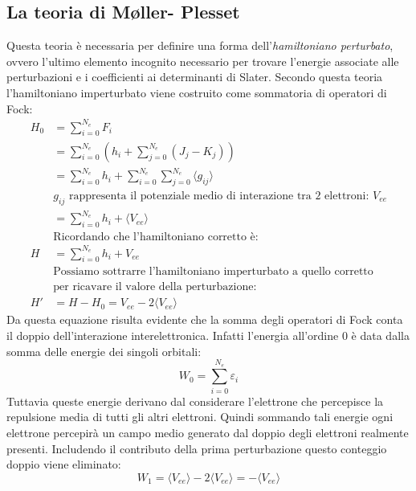 \documentclass[oneside]{amsbook}
\numberwithin{section}{chapter}
\numberwithin{equation}{section}
\numberwithin{figure}{section}
\begin{document}
\subsection{La teoria di M{\o}ller- Plesset}
Questa teoria è necessaria per definire una forma dell'\emph{hamiltoniano perturbato}, ovvero l'ultimo elemento incognito necessario per trovare l'energie associate alle perturbazioni e i coefficienti ai determinanti di Slater.
Secondo questa teoria l'hamiltoniano imperturbato viene costruito come sommatoria di operatori di Fock:
\begin{equation}
\begin{aligned}
H_0 &= \sum \limits _{i=0} ^{N_e} F_i \\
&= \sum \limits _{i=0} ^{N_e} \left( h_i +\sum \limits _{j=0} ^{N_e} (J_j-K_j)\right) \\
&= \sum \limits _{i=0} ^{N_e} h_i + \sum \limits _{i=0} ^{N_e}\sum \limits _{j=0} ^{N_e} \langle g_{ij} \rangle \\
&g_{ij} \text{ rappresenta il potenziale medio di interazione tra 2 elettroni: } V_{ee}\\
&= \sum \limits _{i=0} ^{N_e} h_i +  \langle V_{ee} \rangle \\
&\text{Ricordando che l'hamiltoniano corretto è:}\\
H &= \sum \limits _{i=0} ^{N_e} h_i + V_{ee} \\
&\text{Possiamo sottrarre l'hamiltoniano imperturbato a quello corretto} \\
 &\text{per ricavare il valore della perturbazione:}\\
H' &= H- H_0 = V_{ee}-2  \langle V_{ee} \rangle
\end{aligned}
\end{equation}
Da questa equazione risulta evidente che la somma degli operatori di Fock conta il doppio dell'interazione interelettronica. Infatti l'energia all'ordine 0 è data dalla somma delle energie dei singoli orbitali:
\begin{equation}
W_0= \sum \limits _{i=0} ^{N_e} \varepsilon_i
\end{equation}
Tuttavia queste energie derivano dal considerare l'elettrone che percepisce la repulsione media di tutti gli altri elettroni. Quindi sommando tali energie ogni elettrone percepirà un campo medio generato dal doppio degli elettroni realmente presenti.
Includendo il contributo della prima perturbazione questo conteggio doppio viene eliminato:
\begin{equation}
W_1 =  \langle V_{ee} \rangle-2  \langle V_{ee} \rangle = -\langle V_{ee} \rangle
\end{equation}
\end{document}
